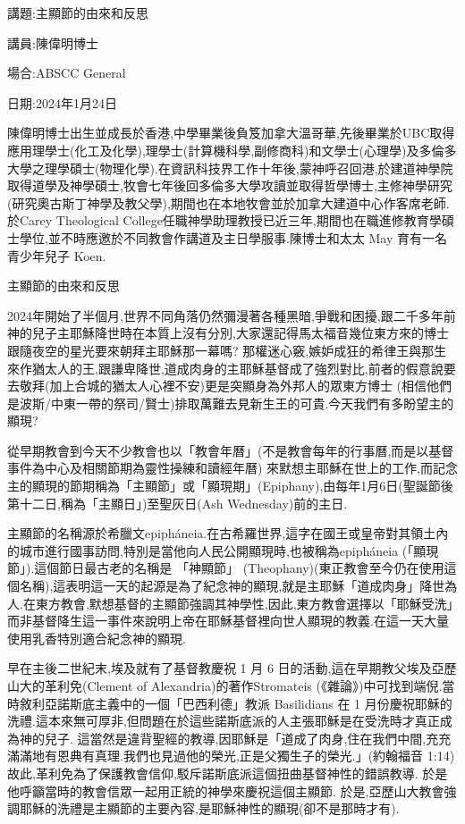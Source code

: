 \documentclass{book}
\begin{document}
講題:主顯節的由來和反思

講員:陳偉明博士

場合:ABSCC General

日期:2024年1月24日

陳偉明博士出生並成長於香港,中學畢業後負笈加拿大溫哥華,先後畢業於UBC取得應用理學士(化工及化學),理學士(計算機科學,副修商科)和文學士(心理學)及多倫多大學之理學碩士(物理化學).在資訊科技界工作十年後,蒙神呼召回港,於建道神學院取得道學及神學碩士,牧會七年後回多倫多大學攻讀並取得哲學博士,主修神學研究(研究奧古斯丁神學及教父學),期間也在本地牧會並於加拿大建道中心作客席老師.於Carey Theological College任職神學助理教授已近三年,期間也在職進修教育學碩士學位,並不時應邀於不同教會作講道及主日學服事.陳博士和太太 May 育有一名青少年兒子 Koen.

主顯節的由來和反思

2024年開始了半個月,世界不同角落仍然彌漫著各種黑暗,爭戰和困擾,跟二千多年前神的兒子主耶穌降世時在本質上沒有分別,大家還記得馬太福音幾位東方來的博士跟隨夜空的星光要來朝拜主耶穌那一幕嗎? 那權迷心竅,嫉妒成狂的希律王與那生來作猶太人的王,跟謙卑降世,道成肉身的主耶穌基督成了強烈對比,前者的假意說要去敬拜(加上合城的猶太人心裡不安)更是突顯身為外邦人的眾東方博士 (相信他們是波斯/中東一帶的祭司/賢士)排取萬難去見新生王的可貴.今天我們有多盼望主的顯現?

從早期教會到今天不少教會也以「教會年曆」(不是教會每年的行事曆,而是以基督事件為中心及相關節期為靈性操練和讀經年曆) 來默想主耶穌在世上的工作,而記念主的顯現的節期稱為「主顯節」或「顯現期」(Epiphany),由每年1月6日(聖誕節後第十二日,稱為「主顯日」)至聖灰日(Ash Wednesday)前的主日.

主顯節的名稱源於希臘文epipháneia.在古希羅世界,這字在國王或皇帝對其領土內的城市進行國事訪問,特別是當他向人民公開顯現時,也被稱為epipháneia (「顯現節」).這個節日最古老的名稱是 「神顯節」 (Theophany)(東正教會至今仍在使用這個名稱),這表明這一天的起源是為了紀念神的顯現,就是主耶穌「道成肉身」降世為人.在東方教會,默想基督的主顯節強調其神學性,因此,東方教會選擇以「耶穌受洗」而非基督降生這一事件來說明上帝在耶穌基督裡向世人顯現的教義.在這一天大量使用乳香特別適合紀念神的顯現.

早在主後二世紀末,埃及就有了基督教慶祝 1 月 6 日的活動,這在早期教父埃及亞歷山大的革利免(Clement of Alexandria)的著作Stromateis (《雜論》)中可找到端倪.當時敘利亞諾斯底主義中的一個「巴西利德」教派 Basilidians 在 1 月份慶祝耶穌的洗禮.這本來無可厚非,但問題在於這些諾斯底派的人主張耶穌是在受洗時才真正成為神的兒子. 這當然是違背聖經的教導,因耶穌是「道成了肉身,住在我們中間,充充滿滿地有恩典有真理.我們也見過他的榮光,正是父獨生子的榮光.」(約翰福音 1:14)故此,革利免為了保護教會信仰,駁斥諾斯底派這個扭曲基督神性的錯誤教導. 於是他呼籲當時的教會信眾一起用正統的神學來慶祝這個主顯節. 於是,亞歷山大教會強調耶穌的洗禮是主顯節的主要內容,是耶穌神性的顯現(卻不是那時才有).
\end{document}
